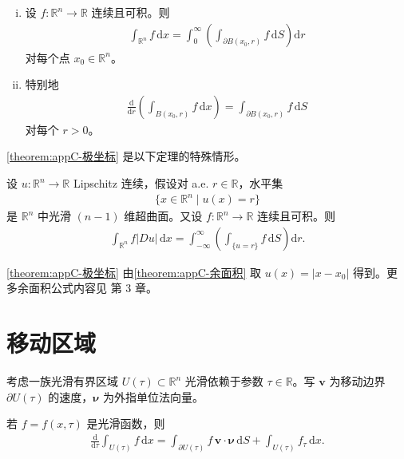 \documentclass[../main.tex]{subfiles}
\begin{document}
\begin{theorem}[极坐标公式]\label{theorem:appC-极坐标}
\begin{enumerate}[(i)]
\item 设 $f:\mathbb{R}^n\to\mathbb{R}$ 连续且可积。则
\begin{align*}
\int_{\mathbb{R}^n}f\,\mathrm{d}x=\int_0^\infty\left(\int_{\partial B(x_0,r)}f\,\mathrm{d}S\right)\mathrm{d}r
\end{align*}
对每个点 $x_0\in\mathbb{R}^n$。
\item 特别地
\begin{align*}
\frac{\mathrm{d}}{\mathrm{d}r}\left(\int_{B(x_0,r)}f\,\mathrm{d}x\right)=\int_{\partial B(x_0,r)}f\,\mathrm{d}S
\end{align*}
对每个 $r>0$。
\end{enumerate}
\end{theorem}

\cref{theorem:appC-极坐标} 是以下定理的特殊情形。

\begin{theorem}[余面积公式。]\label{theorem:appC-余面积}设 $u:\mathbb{R}^n\to\mathbb{R}$ Lipschitz 连续，假设对 a.e. $r\in\mathbb{R}$，水平集
\begin{align*}
\{x\in\mathbb{R}^n\mid u(x)=r\}
\end{align*}
是 $\mathbb{R}^n$ 中光滑 $(n-1)$ 维超曲面。又设 $f:\mathbb{R}^n\to\mathbb{R}$ 连续且可积。则
\begin{align*}
\int_{\mathbb{R}^n}f|Du|\,\mathrm{d}x=\int_{-\infty}^\infty\left(\int_{\{u=r\}}f\,\mathrm{d}S\right)\mathrm{d}r.
\end{align*}
\end{theorem}

\cref{theorem:appC-极坐标} 由\cref{theorem:appC-余面积} 取 $u(x)=|x-x_0|$ 得到。更多余面积公式内容见 \cite{E-G} 第 3 章。

\section{移动区域}\label{section:appC-移动区域}

考虑一族光滑有界区域 $U(\tau)\subset\mathbb{R}^n$ 光滑依赖于参数 $\tau\in\mathbb{R}$。写 $\mathbf{v}$ 为移动边界 $\partial U(\tau)$ 的速度，$\boldsymbol{\nu}$ 为外指单位法向量。

\begin{theorem}[移动区域的微分公式。]\label{theorem:appC-移动区域微分}若 $f=f(x,\tau)$ 是光滑函数，则
\begin{align*}
\frac{\mathrm{d}}{\mathrm{d}\tau}\int_{U(\tau)}f\,\mathrm{d}x=\int_{\partial U(\tau)}f\,\mathbf{v}\cdot\boldsymbol{\nu}\,\mathrm{d}S+\int_{U(\tau)}f_\tau\,\mathrm{d}x.
\end{align*}
\end{theorem}
\end{document}
